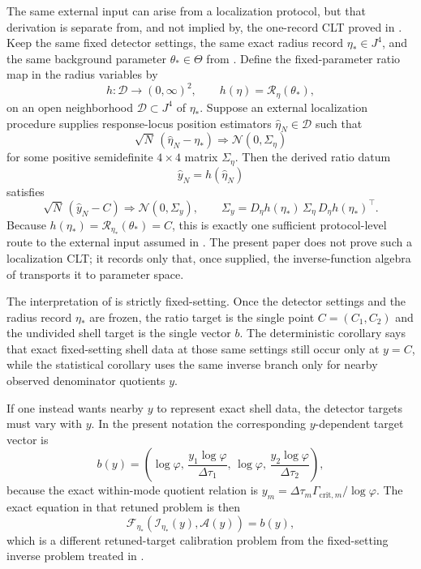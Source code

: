 \begin{remark}\label{prop:ratio-data-shell-source-main}
The same external input can arise from a localization protocol, but
that derivation is separate from, and not implied by, the one-record CLT proved in
. Keep the same fixed detector settings, the same exact
radius record $\eta_*\in J^4$, and the same background parameter
$\theta_*\in\Theta$ from . Define the
fixed-parameter ratio map in the radius variables by
\[
h:\mathcal D\to(0,\infty)^2,
\qquad
h(\eta)=\mathcal R_\eta(\theta_*),
\]
on an open neighborhood $\mathcal D\subset J^4$ of $\eta_*$. Suppose an
external localization procedure supplies response-locus position estimators
$\widehat\eta_N\in\mathcal D$ such that
\[
\sqrt N\,(\widehat\eta_N-\eta_*)
\Longrightarrow
\mathcal N(0,\Sigma_\eta)
\]
for some positive semidefinite $4\times4$ matrix $\Sigma_\eta$. Then the
derived ratio datum
\[
\widehat y_N=h(\widehat\eta_N)
\]
satisfies
\[
\sqrt N\,(\widehat y_N-C)
\Longrightarrow
\mathcal N(0,\Sigma_y),
\qquad
\Sigma_y=
D_\eta h(\eta_*)\,\Sigma_\eta\,D_\eta h(\eta_*)^\top.
\]
Because $h(\eta_*)=\mathcal R_{\eta_*}(\theta_*)=C$, this is exactly one
sufficient protocol-level route to the external input assumed in
. The present paper does not prove such a
localization CLT; it records only that, once supplied, the inverse-function
algebra of  transports it to parameter space.
\end{remark}

\begin{remark}\label{rem:fixed-target-versus-retuned-main}
The interpretation of
 is strictly fixed-setting.
Once the detector settings and the radius record $\eta_*$ are frozen, the ratio
target is the single point $C=(C_1,C_2)$ and the undivided shell target is the
single vector $b$. The deterministic corollary  says
that exact fixed-setting shell data at those same settings still occur only at
$y=C$, while the statistical corollary  uses the
same inverse branch only for nearby observed denominator quotients $y$.

If one instead wants nearby $y$ to represent exact shell data, the detector
targets must vary with $y$. In the present notation the corresponding
$y$-dependent target vector is
\[
b(y)=
\left(
\log\varphi,\,
\frac{y_1\log\varphi}{\Delta\tau_1},\,
\log\varphi,\,
\frac{y_2\log\varphi}{\Delta\tau_2}
\right),
\]
because the exact within-mode quotient relation is
$y_m=\Delta\tau_m\Gamma_{{\mathrm{crit}},m}/\log\varphi$. The exact equation in
that retuned problem is then
\[
\mathcal F_{\eta_*}(\mathcal I_{\eta_*}(y),\mathcal A(y))=b(y),
\]
which is a different retuned-target calibration problem from the fixed-setting inverse problem
treated in .
\end{remark}

